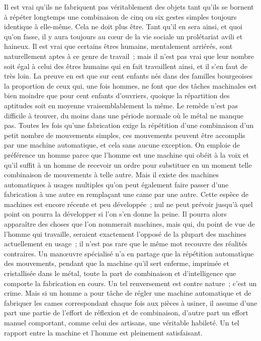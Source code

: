 \documentclass[french,twoside]{book} %
\begin{document}
Il est vrai qu'ils ne fabriquent pas véritablement des objets tant qu'ils se bornent à répéter longtemps une combinaison de cinq ou six gestes simples toujours identique à elle-même. Cela ne doit plus être. Tant qu'il en sera ainsi, et quoi qu'on fasse, il y aura toujours au cœur de la vie sociale un prolétariat avili et haineux. Il est vrai que certains êtres humains, mentalement arriérés, sont naturellement aptes à ce genre de travail ; mais il n'est pas vrai que leur nombre soit égal à celui des êtres humains qui en fait travaillent ainsi, et il s'en faut de très loin. La preuve en est que sur cent enfants nés dans des familles bourgeoises la proportion de ceux qui, une fois hommes, ne font que des tâches machinales est bien moindre que pour cent enfants d'ouvriers, quoique la répartition des aptitudes soit en moyenne vraisemblablement la même. Le remède n'est pas difficile à trouver, du moins dans une période normale où le métal ne manque pas. Toutes les fois qu'une fabrication exige la répétition d'une combinaison d'un petit nombre de mouvements simples, ces mouvements peuvent être accomplis par une machine automatique, et cela sans aucune exception. On emploie de préférence un homme parce que l'homme est une machine qui obéit à la voix et qu'il suffit à un homme de recevoir un ordre pour substituer en un moment telle combinaison de mouvements à telle autre. Mais il existe des machines automatiques à usages multiples qu'on peut également faire passer d'une fabrication à une autre en remplaçant une came par une autre. Cette espèce de machines est encore récente et peu développée ; nul ne peut prévoir jusqu'à quel point on pourra la développer si l'on s'en donne la peine. Il pourra alors apparaître des choses que l'on nommerait machines, mais qui, du point de vue de l'homme qui travaille, seraient exactement l'opposé de la plupart des machines actuellement en usage ; il n'est pas rare que le même mot recouvre des réalités contraires. Un manœuvre spécialisé n'a en partage que la répétition automatique des mouvements, pendant que la machine qu'il sert enferme, imprimée et cristallisée dans le métal, toute la part de combinaison et d'intelligence que comporte la fabrication en cours. Un tel renversement est contre nature ; c'est un crime. Mais si un homme a pour tâche de régler une machine automatique et de fabriquer les cames correspondant chaque fois aux pièces à usiner, il assume d'une part une partie de l'effort de réflexion et de combinaison, d'autre part un effort manuel comportant, comme celui des artisans, une véritable habileté. Un tel rapport entre la machine et l'homme est pleinement satisfaisant.\par
\end{document}
